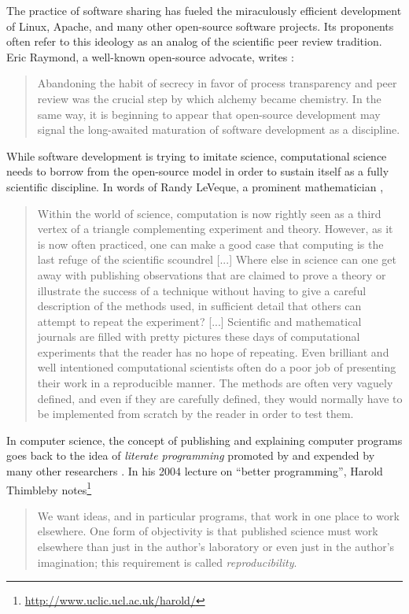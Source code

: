 The practice of software sharing has fueled the miraculously efficient
development of Linux, Apache, and many other open-source software
projects.  Its proponents often refer to this ideology as an analog of
the scientific peer review tradition. Eric Raymond, a well-known
open-source advocate, writes \cite[]{taoup}:
\begin{quote}
  Abandoning the habit of secrecy in favor of process transparency and
  peer review was the crucial step by which alchemy became chemistry.
  In the same way, it is beginning to appear that open-source
  development may signal the long-awaited maturation of software
  development as a discipline.
\end{quote}
While software development is trying to imitate science, computational
science needs to borrow from the open-source model in order to sustain
itself as a fully scientific discipline. In words of Randy LeVeque, a
prominent mathematician \cite[]{randy},
\begin{quote}
  Within the world of science, computation is now rightly seen as a
  third vertex of a triangle complementing experiment and
  theory. However, as it is now often practiced, one can make a good
  case that computing is the last refuge of the scientific scoundrel
  [...]  Where else in science can one get away with publishing
  observations that are claimed to prove a theory or illustrate the
  success of a technique without having to give a careful description of
  the methods used, in sufficient detail that others can attempt to
  repeat the experiment? [...]  Scientific and mathematical journals are
  filled with pretty pictures these days of computational experiments
  that the reader has no hope of repeating. Even brilliant and well
  intentioned computational scientists often do a poor job of presenting
  their work in a reproducible manner. The methods are often very
  vaguely defined, and even if they are carefully defined, they would
  normally have to be implemented from scratch by the reader in order to
  test them.
\end{quote}

In computer science, the concept of publishing and explaining computer
programs goes back to the idea of \emph{literate programming} promoted
by \cite{knuth} and expended by many other researchers
\cite[]{thimbleby}. In his 2004 lecture on ``better programming'',
Harold Thimbleby notes\footnote{\url{http://www.uclic.ucl.ac.uk/harold/}}
\begin{quote}
  We want ideas, and in particular programs, that work in one place to
  work elsewhere. One form of objectivity is that published science
  must work elsewhere than just in the author's laboratory or even
  just in the author's imagination; this requirement is called
  \emph{reproducibility}.
\end{quote}

